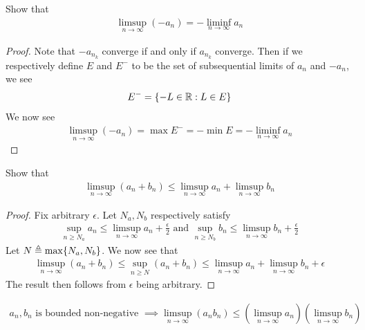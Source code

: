 \documentclass{report}
\begin{document}
\begin{question}{}{}
Show that 
\begin{align*}
\limsup_{n\to\infty} (-a_n)=- \liminf_{n\to\infty}  a_n
\end{align*}
\end{question}
\begin{proof}
Note that $-a_{n_k}$ converge if and only if $a_{n_k}$ converge. Then if we respectively define $E$ and $E^-$ to be the set of subsequential limits of  $a_n$ and  $-a_n$, we see 
 \begin{align*}
E^-= \{ -L\in\mathbb{R} : L \in E  \}
\end{align*}
We now see 
\begin{align*}
\limsup_{n\to\infty} (-a_n)=\max E^-= -\min E =- \liminf_{n\to\infty} a_n
\end{align*}

\end{proof}
\begin{question}{}{}
Show that 
\begin{align}
\label{pb}
\limsup_{n\to\infty} (a_n+b_n)\leq \limsup_{n\to\infty} a_n+\limsup_{n\to\infty}  b_n
\end{align}
\end{question}
\begin{proof}
Fix arbitrary $\epsilon $. Let $N_a,N_b$ respectively satisfy 
 \begin{align*}
 \sup_{n\geq N_a}a_n\leq \limsup_{n\to\infty} a_n + \frac{\epsilon}{2}\text{ and }\sup_{n \geq N_b}b_n \leq \limsup_{n\to\infty} b_n + \frac{\epsilon}{2}
\end{align*}
Let $N\triangleq \max \{ N_a,N_b \}$. We now see that 
\begin{align*}
\limsup_{n\to\infty} (a_n+b_n)\leq \sup_{n \geq N} (a_n+b_n)\leq \limsup_{n\to\infty} a_n + \limsup_{n\to\infty} b_n + \epsilon 
\end{align*}
The result then follows from $\epsilon $ being arbitrary.  
\end{proof}
\begin{question}{}{}
\begin{align}
\label{pc}
a_n,b_n\text{ is bounded non-negative }\implies \limsup_{n\to\infty} (a_nb_n)\leq (\limsup_{n\to\infty} a_n)(\limsup_{n\to\infty} b_n)
\end{align}
\end{question}
\end{document}
